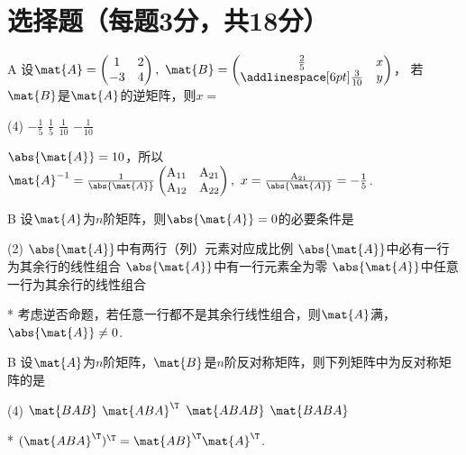\section{选择题（每题3分，共18分）}
\setcounter{prob}{0}

\begin{choice}{A}
设$\mat{A}=\begin{pmatrix}
    1 & 2\\
    -3 & 4
\end{pmatrix},\ \mat{B}=
\begin{pmatrix}
    \frac25 & x  \\
    \addlinespace[6pt]
    \frac{3}{10} & y 
\end{pmatrix}$，
若$\mat{B}$是$\mat{A}$的逆矩阵，则$x=$
\begin{tasks}(4)
    \task $-\frac15$
    \task $\frac15$
    \task $\frac{1}{10}$
    \task $-\frac{1}{10}$
\end{tasks}
\end{choice}
\begin{solution}
    $\abs{\mat{A}}=10$，所以$\mat{A}^{-1}=\frac{1}{\abs{\mat{A}}}\begin{pmatrix}
        \mathrm{A}_{11} & \mathrm{A}_{21}\\
        \mathrm{A}_{12} & \mathrm{A}_{22}
    \end{pmatrix},\ x=\frac{\mathrm{A}_{21}}{\abs{\mat{A}}}=-\frac15$. 
\end{solution}

\begin{choice}{B}
    设$\mat{A}$为$n$阶矩阵，则$\abs{\mat{A}}=0$的必要条件是
\begin{tasks}(2)
    \task $\abs{\mat{A}}$中有两行（列）元素对应成比例
    \task $\abs{\mat{A}}$中必有一行为其余行的线性组合
    \task $\abs{\mat{A}}$中有一行元素全为零
    \task $\abs{\mat{A}}$中任意一行为其余行的线性组合
\end{tasks}
\end{choice}
\begin{solution}*
    考虑逆否命题，若任意一行都不是其余行线性组合，则$\mat{A}$满，$\abs{\mat{A}}\neq0$. 
\end{solution}

\begin{choice}{B}
    设$\mat{A}$为$n$阶矩阵，$\mat{B}$是$n$阶反对称矩阵，则下列矩阵中为反对称矩阵的是
\begin{tasks}(4)
    \task $\mat{BAB}$
    \task $\mat{ABA}^\T$
    \task $\mat{ABAB}$
    \task $\mat{BABA}$
\end{tasks}
\end{choice}
\begin{solution}*
    $(\mat{ABA}^\T)^\T=\mat{AB}^\T\mat{A}^\T$.
\end{solution}
        
